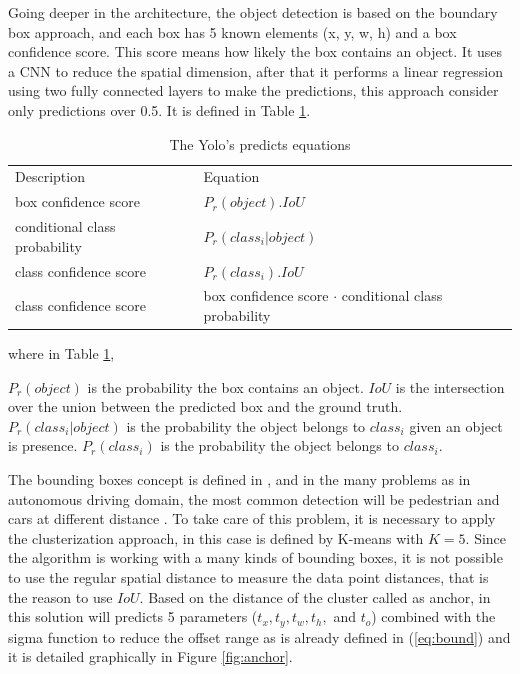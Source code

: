 Going deeper in the architecture, the object detection is based on the boundary box approach, and each box has 5 known elements (x, y, w, h) and a box confidence score. This score means how likely the box contains an object. It uses a CNN to reduce the spatial dimension, after that it performs a linear regression using two fully connected layers to make the predictions, this approach consider only predictions over 0.5. It is defined in Table \ref{eq:prob_yolo}. 


\begin{table}[H]
\centering
\caption{The Yolo's predicts equations}
\begin{tabular}{l|l} 
\toprule
Description~                   & Equation                                                                 \\
box confidence score           & $P_r(object).IoU$                                                     \\
conditional class probability~ & $P_r(class_i|object)$                                       \\
class confidence score         & $P_r(class_i).IoU$                                                   \\
class confidence score         & box confidence score $\cdot$ conditional class probability  \\
\bottomrule
\end{tabular}
\label{eq:prob_yolo}
\end{table}

where in Table \ref{eq:prob_yolo}, 

$P_r(object)$ is the probability the box contains an object.
$IoU$ is the intersection over the union between the predicted box and the ground truth.
$P_r(class_i|object)$ is the probability the object belongs to $class_i$ given an object is presence.
$P_r(class_i)$ is the probability the object belongs to $class_i$.

The bounding boxes concept is defined in \cite{redmon2017yolo9000}, and in the many problems as in autonomous driving domain, the most common detection will be pedestrian and cars at different distance \cite{ess2010object}. To take care of this problem, it is necessary to apply the clusterization approach, in this case is defined by K-means with $K=5$. Since the algorithm is working with a many kinds of bounding boxes, it is not possible to use the regular spatial distance to measure the data point distances, that is the reason to use $IoU$. Based on the distance of the cluster called as anchor, in this solution will predicts 5 parameters ($t_x, t_y, t_w, t_h,$ and $t_o$) combined with the sigma function to reduce the offset range as is already defined in (\ref{eq:bound}) and it is detailed graphically in Figure \ref{fig:anchor}.


